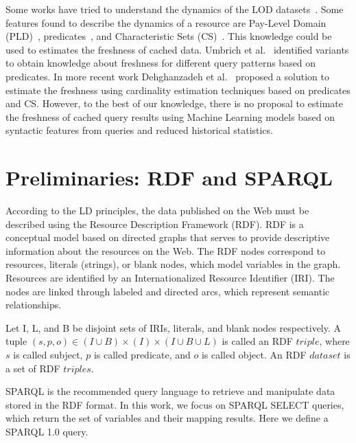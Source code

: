 \documentclass[runningheads]{llncs}
\begin{document}
Some works have tried to understand the dynamics of the LOD datasets~\cite{UmbrichHHPD10,UmbrichKL10,KaferAUOH13,DividinoSGG13,NishiokaS16}. Some features found to describe the dynamics of a resource are Pay-Level Domain (PLD)~\cite{NishiokaS16,NishiokaS17}, predicates~\cite{KaferAUOH13,NishiokaS17}, and Characteristic Sets (CS)~\cite{NishiokaS16,GonzalezH18}. This knowledge could be used to estimates the freshness of cached data. Umbrich et al.~\cite{UmbrichKHP12,UmbrichKPPH12,ekawUmbrichKHP12} identified variants to obtain knowledge about freshness for different query patterns based on predicates. In more recent work Dehghanzadeh et al.~\cite{DehghanzadehPKUHD14} proposed a solution to estimate the freshness using cardinality estimation techniques based on predicates and CS. However, to the best of our knowledge, there is no proposal to estimate the freshness of cached query results using Machine Learning models based on syntactic features from queries and reduced historical statistics.

%
\section{Preliminaries: RDF and SPARQL}
\label{sec:preliminar}

According to the LD principles, the data published on the Web must be described using the Resource Description Framework (RDF). RDF is a conceptual model based on directed graphs that serves to provide descriptive information about the resources on the Web. The RDF nodes correspond to resources, literals (strings), or blank nodes, which model variables in the graph. Resources are identified by an Internationalized Resource Identifier (IRI). The nodes are linked through labeled and directed arcs, which represent semantic relationships.

\begin{definition}
	Let I, L, and B be disjoint sets of IRIs, literals, and blank nodes respectively. A tuple $ (s, p, o) \in (I \cup  B)  \times (I)  \times  (I \cup  B \cup  L)$  is called an RDF $ triple $, where $ s $ is called subject, $ p $ is called predicate, and $ o $ is called object. An RDF $dataset$ is a set of RDF $triples$.
\end{definition}

SPARQL is the recommended query language to retrieve and manipulate data stored in the RDF format. In this work, we focus on SPARQL SELECT queries, which return the set of variables and their mapping results. Here we define a SPARQL 1.0 query. 
\end{document}
